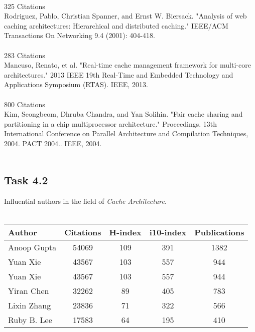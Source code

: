 \documentclass{article}
\begin{document}
	\\
	325 Citations\\
	\noindent [8] Rodriguez, Pablo, Christian Spanner, and Ernst W. Biersack. "Analysis of web caching architectures: Hierarchical and distributed caching." IEEE/ACM Transactions On Networking 9.4 (2001): 404-418.\\
	\\
	283 Citations\\
	\noindent [9] Mancuso, Renato, et al. "Real-time cache management framework for multi-core architectures." 2013 IEEE 19th Real-Time and Embedded Technology and Applications Symposium (RTAS). IEEE, 2013.\\
	\\
	800 Citations\\
	\noindent [10] Kim, Seongbeom, Dhruba Chandra, and Yan Solihin. "Fair cache sharing and partitioning in a chip multiprocessor architecture." Proceedings. 13th International Conference on Parallel Architecture and Compilation Techniques, 2004. PACT 2004.. IEEE, 2004.\\
	\\
	
	\subsection*{Task 4.2}
	Influential authors in the field of \textit{Cache Architecture}.\\
	\\
	\begin{tabular}{|l| c| c | c | c |} 
		\hline
		Author & Citations & H-index & i10-index & Publications \\ [0.5ex] 
		
		\hline\hline
		Anoop Gupta & 54069 & 109 & 391 & 1382 \\
		\hline
		Yuan Xie & 43567 & 103 & 557 & 944 \\
		\hline
		Yuan Xie & 43567 & 103 & 557 & 944 \\
		\hline
		Yiran Chen & 32262 & 89 & 405 & 783 \\
		\hline
		Lixin Zhang & 23836 & 71 & 322 & 566 \\
		\hline
		Ruby B. Lee & 17583 & 64 & 195 &  410 \\ [1ex] 
		\hline
	\end{tabular}
	
	
\end{document}
